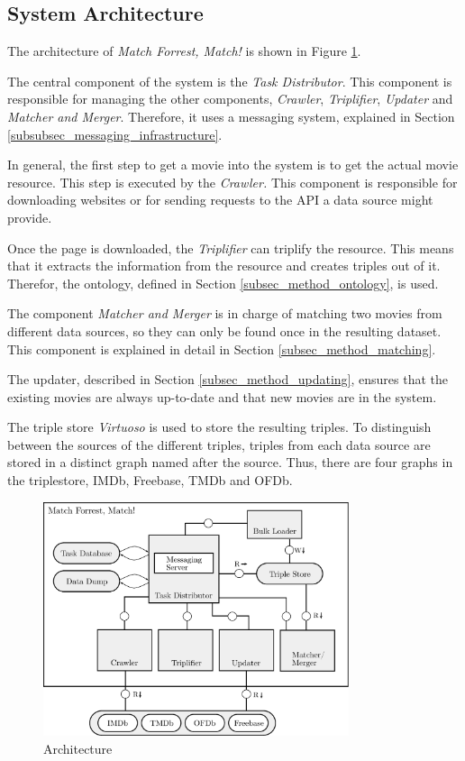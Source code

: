 \subsection{System Architecture}
\label{subsec_method_architecture}

The architecture of \emph{Match Forrest, Match!} is shown in Figure \ref{fig_architecture}.

The central component of the system is the \textit{Task Distributor}.
This component is responsible for managing the other components, \textit{Crawler}, \textit{Triplifier}, \textit{Updater} and \textit{Matcher and Merger}.
Therefore, it uses a messaging system, explained in Section \ref{subsubsec_messaging_infrastructure}.

In general, the first step to get a movie into the system is to get the actual movie resource.
This step is executed by the \textit{Crawler.}
This component is responsible for downloading websites or for sending requests to the API a data source might provide.

Once the page is downloaded, the \textit{Triplifier} can triplify the resource.
This means that it extracts the information from the resource and creates triples out of it.
Therefor, the ontology, defined in Section \ref{subsec_method_ontology}, is used.

The component \textit{Matcher and Merger} is in charge of matching two movies from different data sources, so they can only be found once in the resulting dataset.
This component is explained in detail in Section \ref{subsec_method_matching}.

The updater, described in Section \ref{subsec_method_updating}, ensures that the existing movies are always up-to-date and that new movies are in the system.

The triple store \textit{Virtuoso} is used to store the resulting triples.
To distinguish between the sources of the different triples, triples from each data source are stored in a distinct graph named after the source.
Thus, there are four graphs in the triplestore, IMDb, Freebase, TMDb and OFDb.

\begin{figure}[ht]
  \begin{center}
  \includegraphics[width=0.8\textwidth]{images/architecture.pdf}
  \end{center}
  \caption{Architecture}
  \label{fig_architecture}
\end{figure}

